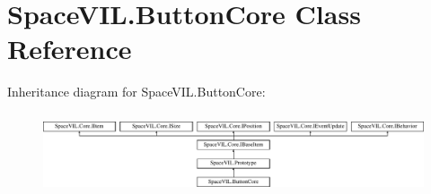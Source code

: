 \hypertarget{class_space_v_i_l_1_1_button_core}{}\section{Space\+V\+I\+L.\+Button\+Core Class Reference}
\label{class_space_v_i_l_1_1_button_core}
Inheritance diagram for Space\+V\+I\+L.\+Button\+Core\+:\begin{figure}[H]
\begin{center}
\leavevmode
\includegraphics[height=2.421622cm]{class_space_v_i_l_1_1_button_core}
\end{center}
\end{figure}
